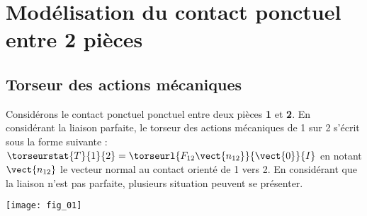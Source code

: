 \def\xxactivite{Cours}
\def\xxauteur{\textsl{Xavier Pessoles}}

\fichetrue
\proftrue
\tdfalse
\coursfalse

\def\xxnumpartie{Rév -- Stat}
\def\xxpartie{Modélisation des actions mécaniques dans les systèmes}
\def\xxnumchapitre{ Révisions 2\vspace{.2cm}}
\def\xxchapitre{\hspace{.12cm} Modélisation du frottement}

\def\xxpied{%
Révision statique -- Modélisation des actions mécaniques\\
Fiche 2 -- \xxactivite%
}


\def\xxcompetences{%
\textsl{%
\textbf{Savoirs et compétences :}\\
}}


\iflivret

\else

\fi
\setlength{\columnseprule}{.1pt}

\vspace{2cm}
\pagestyle{fancy}
\thispagestyle{plain}


\section{Modélisation du contact ponctuel entre 2 pièces}
\subsection{Torseur des actions mécaniques}
\noindent\begin{minipage}[c]{.7\linewidth}
Considérons le contact ponctuel ponctuel entre deux pièces \textbf{1} et \textbf{2}. En considérant la liaison parfaite, le torseur des actions mécaniques de 1 sur 2 s'écrit sous la forme suivante : $\torseurstat{T}{1}{2}=\torseurl{F_{12} \vect{n_{12}}}{\vect{0}}{I}$ en notant $\vect{n_{12}}$ le vecteur normal au contact orienté de 1 vers 2. 
En considérant que la liaison n'est pas parfaite, plusieurs situation peuvent se présenter.  
\end{minipage}\hfill
\begin{minipage}[c]{.25\linewidth}
\begin{center}
\texttt{[image: fig\_01]}
\end{center}
\end{minipage}

